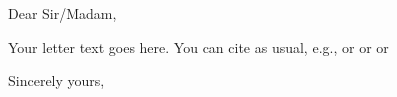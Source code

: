 \documentclass[11pt, autobio,autobib]{iitletterProf}
\date{\today}  %
\begin{document}
\begin{letter}{}

\opening{Dear Sir/Madam,}

\begin{center} \textbf{ } \end{center}

Your letter text goes here. You can cite as usual,
e.g., \textcite{Hic97a} or \parencite{Hic97a} or \textcite{Nie92} or \parencite{Nie92}

\closing{Sincerely yours,}



\end{letter}
\end{document}
